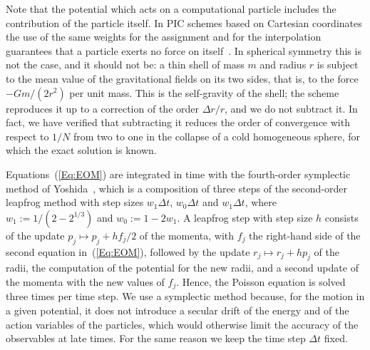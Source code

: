 Note that the potential which acts on a computational particle includes the contribution of the particle itself. In PIC schemes based on Cartesian coordinates the use of the same weights for the assignment and for the interpolation guarantees that a particle exerts no force on itself~\cite{BirdsallLangdon-Book,HockneyEastwood-Book}. In spherical symmetry this is not the case, and it should not be: a thin shell of mass $m$ and radius $r$ is subject to the mean value of the gravitational fields on its two sides, that is, to the force $-G m/(2r^2)$ per unit mass. This is the self-gravity of the shell; the scheme reproduces it up to a correction of the order $\Delta r/r$, and we do not subtract it. In fact, we have verified that subtracting it reduces the order of convergence with respect to $1/N$ from two to one in the collapse of a cold homogeneous sphere, for which the exact solution is known.

Equations~(\ref{Eq:EOM}) are integrated in time with the fourth-order symplectic method of Yoshida~\cite{hY90}, which is a composition of three steps of the second-order leapfrog method with step sizes $w_1\Delta t$, $w_0\Delta t$ and $w_1\Delta t$, where $w_1 := 1/(2 - 2^{1/3})$ and $w_0 := 1 - 2w_1$. A leapfrog step with step size $h$ consists of the update $p_j\mapsto p_j + h f_j/2$ of the momenta, with $f_j$ the right-hand side of the second equation in~(\ref{Eq:EOM}), followed by the update $r_j\mapsto r_j + h p_j$ of the radii, the computation of the potential for the new radii, and a second update of the momenta with the new values of $f_j$. Hence, the Poisson equation is solved three times per time step. We use a symplectic method because, for the motion in a given potential, it does not introduce a secular drift of the energy and of the action variables of the particles, which would otherwise limit the accuracy of the observables at late times. For the same reason we keep the time step $\Delta t$ fixed.

